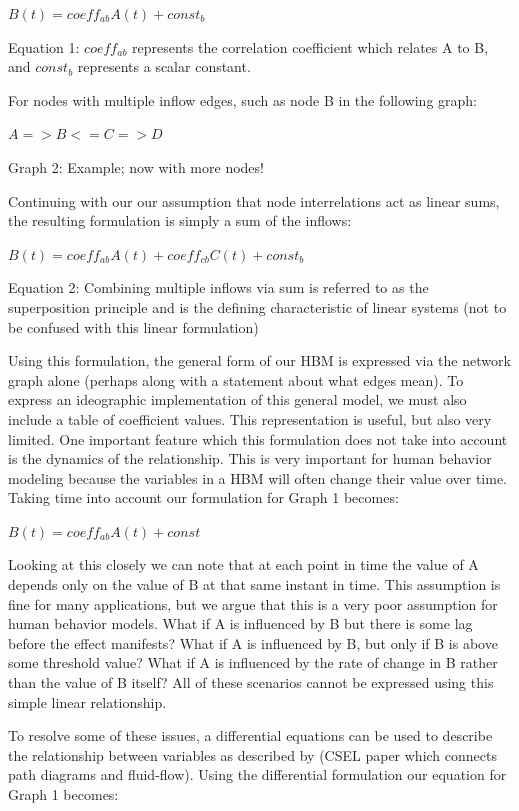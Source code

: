 \documentclass[conference]{IEEEtran}
\begin{document}
$B(t) = coeff_{ab}A(t) + const_b$

Equation 1: $coeff_{ab}$ represents the correlation coefficient which relates A to B, 
and $const_b$ represents a scalar constant.

For nodes with multiple inflow edges, such as node B in the following graph:

$A => B <= C => D$

Graph 2: Example; now with more nodes!

Continuing with our our assumption that node interrelations act as linear sums, the resulting formulation is simply a sum of the inflows:

$B(t) = coeff_{ab}A(t) + coeff_{cb}C(t) + const_b$

Equation 2: Combining multiple inflows via sum is referred to as the superposition principle and is the defining characteristic of linear systems (not to be confused with this linear formulation)

Using this formulation, the general form of our HBM is expressed via the network graph alone (perhaps along with a statement about what edges mean).
To express an ideographic implementation of this general model, we must also include a table of coefficient values. This representation is useful, but also very limited.
One important feature which this formulation does not take into account is the dynamics of the relationship.
This is very important for human behavior modeling because the variables in a HBM will often change their value over time.
Taking time into account our formulation for Graph 1 becomes:

$B(t) = coeff_{ab}A(t) + const$

Looking at this closely we can note that at each point in time the value of A depends only on the value of B at that same instant in time.
This assumption is fine for many applications, but we argue that this is a very poor assumption for human behavior models. What if A is influenced by B but there is some lag before the effect manifests?
What if A is influenced by B, but only if B is above some threshold value? What if A is influenced by the rate of change in B rather than the value of B itself? All of these scenarios cannot be expressed using this simple linear relationship. 

To resolve some of these issues, a differential equations can be used to describe the relationship between variables as described by (CSEL paper which connects path diagrams and fluid-flow). Using the differential formulation our equation for Graph 1 becomes:
\end{document}
